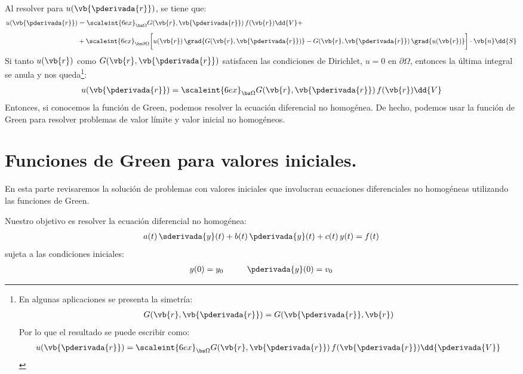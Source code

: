 Al resolver para $u (\vb{\pderivada{r}})$, se tiene que:
\begin{align}
\begin{aligned}[b]
u (\vb{\pderivada{r}}) &= \scaleint{6ex}_{\bs \Omega} G (\vb{r}, \vb{\pderivada{r}}) \, f (\vb{r}) \dd{V} + \\[0.5em]
&+ \scaleint{6ex}_{\bs \partial \Omega} \bigg[ u (\vb{r}) \, \grad{G (\vb{r}, \vb{\pderivada{r}})} - G (\vb{r}, \vb{\pderivada{r}}) \, \grad{u (\vb{r})} \bigg] \cdot \vb{n} \dd{S}
\end{aligned}
\label{eq:ecuacion_07_03}
\end{align}
Si tanto $u (\vb{r})$ como $G (\vb{r}, \vb{\pderivada{r}})$ satisfacen las condiciones de Dirichlet, $u = 0$ en $\partial \Omega$, entonces la última integral se anula y nos queda\footnote{En algunas aplicaciones se presenta la simetría:
\begin{align*}
G (\vb{r}, \vb{\pderivada{r}}) = G (\vb{\pderivada{r}}, \vb{r})
\end{align*}
Por lo que el resultado se puede escribir como:
\begin{align*}
u (\vb{\pderivada{r}}) = \scaleint{6ex}_{\bs \Omega} G (\vb{r}, \vb{\pderivada{r}}) \, f (\vb{\pderivada{r}}) \dd{\pderivada{V}}
\end{align*}
}:
\begin{align*}
u (\vb{\pderivada{r}}) = \scaleint{6ex}_{\bs \Omega} G (\vb{r}, \vb{\pderivada{r}}) \, f (\vb{r}) \dd{V}
\end{align*}
Entonces, si conocemos la función de Green, podemos resolver la ecuación diferencial no homogénea. De hecho, podemos usar la función de Green para resolver problemas de valor límite y valor inicial no homogéneos.

\section{Funciones de Green para valores iniciales.}

En esta parte revisaremos la solución de problemas con valores iniciales que involucran ecuaciones diferenciales no homogéneas utilizando las funciones de Green.
\par
Nuestro objetivo es resolver la ecuación diferencial no homogénea:
\begin{align}
a (t) \, \sderivada{y} (t) + b (t) \, \pderivada{y} (t) + c (t) \, y (t) = f (t)
\label{eq:ecuacion_07_04}
\end{align}
sujeta a las condiciones iniciales:
\begin{align*}
y (0) = y_{0} \hspace{1cm} \pderivada{y} (0) = v_{0}
\end{align*}

